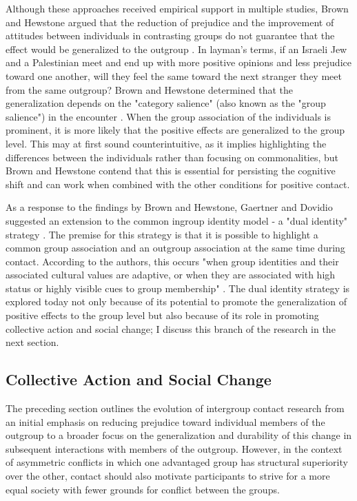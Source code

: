 \documentclass[dissertation,math,vertlayout,pdfa,colorlinks]{aaltoseries}
\begin{document}
Although these approaches received empirical support in multiple studies, Brown and Hewstone argued that the reduction of prejudice and the improvement of attitudes between individuals in contrasting groups do not guarantee that the effect would be generalized to the outgroup \cite{brownIntegrativeTheoryIntergroup2005}. In layman's terms, if an Israeli Jew and a Palestinian meet and end up with more positive opinions and less prejudice toward one another, will they feel the same toward the next stranger they meet from the same outgroup? Brown and Hewstone determined that the generalization depends on the "category salience" (also known as the "group salience") in the encounter \cite{brownChangingAttitudesIntergroup1999,brownIntegrativeTheoryIntergroup2005}. When the group association of the individuals is prominent, it is more likely that the positive effects are generalized to the group level. This may at first sound counterintuitive, as it implies highlighting the differences between the individuals rather than focusing on commonalities, but Brown and Hewstone contend that this is essential for persisting the cognitive shift and can work when combined with the other conditions for positive contact.

As a response to the findings by Brown and Hewstone, Gaertner and Dovidio suggested an extension to the common ingroup identity model - a "dual identity" strategy \cite{gaertnerCategorizationRecategorizationIntergroup2005, brownIntegrativeTheoryIntergroup2005}. The premise for this strategy is that it is possible to highlight a common group association and an outgroup association at the same time during contact. According to the authors, this occurs "when group identities and their associated cultural values are adaptive, or when they are associated with high status or highly visible cues to group membership" \cite[p. 80]{gaertnerCategorizationRecategorizationIntergroup2005}. The dual identity strategy is explored today not only because of its potential to promote the generalization of positive effects to the group level but also because of its role in promoting collective action and social change; I discuss this branch of the research in the next section.

\subsection{Collective Action and Social Change}
\label{sec:collective_action}
The preceding section outlines the evolution of intergroup contact research from an initial emphasis on reducing prejudice toward individual members of the outgroup to a broader focus on the generalization and durability of this change in subsequent interactions with members of the outgroup. However, in the context of asymmetric conflicts in which one advantaged group has structural superiority over the other, contact should also motivate participants to strive for a more equal society with fewer grounds for conflict between the groups. 
\end{document}
